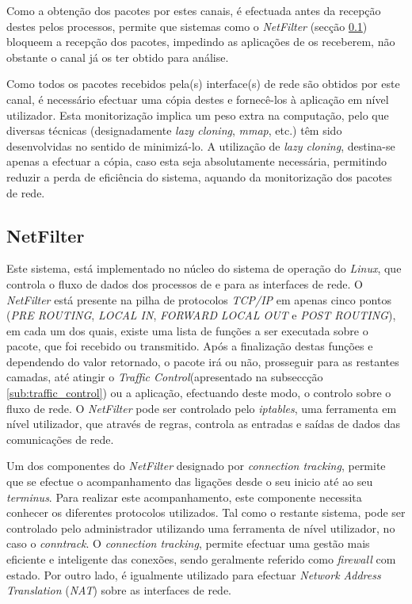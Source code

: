 Como a obtenção dos pacotes por estes canais, é efectuada antes da recepção destes pelos processos, permite que sistemas como o \textit{NetFilter} (secção \ref{sub:netfilter}) bloqueem a recepção dos pacotes, impedindo as aplicações de os receberem, não obstante o canal já os ter obtido para análise.

Como todos os pacotes recebidos pela(s) interface(s) de rede são obtidos por este canal, é necessário efectuar uma cópia destes e fornecê-los à aplicação em nível utilizador.
Esta monitorização implica um peso extra na computação, pelo que diversas técnicas (designadamente \textit{lazy cloning}, \textit{mmap}, etc.) têm sido desenvolvidas no sentido de minimizá-lo.
A utilização de \textit{lazy cloning}, destina-se apenas a efectuar a cópia, caso esta seja absolutamente necessária, permitindo reduzir a perda de eficiência do sistema, aquando da monitorização dos pacotes de rede.




\subsection{NetFilter}
\label{sub:netfilter}
Este sistema, está implementado no núcleo do sistema de operação do \textit{Linux}, que controla o fluxo de dados dos processos de e para as interfaces de rede.
O \textit{NetFilter} está presente na pilha de protocolos \textit{TCP/IP} em apenas cinco pontos (\textit{PRE ROUTING}, \textit{LOCAL IN}, \textit{FORWARD} \textit{LOCAL OUT} e \textit{POST ROUTING}), em cada um dos quais, existe uma lista de funções a ser executada sobre o pacote, que foi recebido ou transmitido.
Após a finalização destas funções e dependendo do valor retornado, o pacote irá ou não, prosseguir para as restantes camadas, até atingir o \textit{Traffic Control}(apresentado na subseccção \ref{sub:traffic_control}) ou a aplicação, efectuando deste modo, o controlo sobre o fluxo de rede.
O \textit{NetFilter} pode ser controlado pelo \textit{iptables}, uma ferramenta em nível utilizador, que através de regras, controla as entradas e saídas de dados das comunicações de rede.

Um dos componentes do \textit{NetFilter} designado por \textit{connection tracking}, permite que se efectue o acompanhamento das ligações desde o seu inicio até ao seu \textit{terminus}.
Para realizar este acompanhamento, este componente necessita conhecer os diferentes protocolos utilizados.
Tal como o restante sistema, pode ser controlado pelo administrador utilizando uma ferramenta de nível utilizador, no caso o \textit{conntrack}.
O \textit{connection tracking}, permite efectuar uma gestão mais eficiente e inteligente das conexões, sendo geralmente referido como \textit{firewall} com estado.
Por outro lado, é igualmente utilizado para efectuar \textit{Network Address Translation} (\textit{NAT}) sobre as interfaces de rede.

